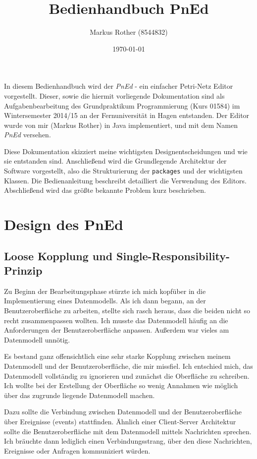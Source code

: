 \documentclass[11pt]{article}
\title{Bedienhandbuch PnEd}
\author{Markus Rother (8544832)}
\date{\today}
\begin{document}
\maketitle


In diesem Bedienhandbuch wird der \emph{PnEd} - ein einfacher Petri-Netz
Editor vorgestellt.  Dieser, sowie die hiermit vorliegende
Dokumentation sind als Aufgabenbearbeitung des Grundpraktikum
Programmierung (Kurs 01584) im Wintersemester 2014/15 an der
Fernuniversität in Hagen entstanden.  Der Editor wurde von mir (Markus
Rother) in Java implementiert, und mit dem Namen \emph{PnEd} versehen.

Diese Dokumentation skizziert meine wichtigsten Designentscheidungen
und wie sie entstanden sind.  Anschließend wird die Grundlegende
Architektur der Software vorgestellt, also die Strukturierung der
\verb|packages| und der wichtigsten Klassen. Die Bedienanleitung
beschreibt detailliert die Verwendung des Editors.  Abschließend wird
das größte bekannte Problem kurz beschrieben.
\pagebreak
\tableofcontents
\pagebreak

\section{Design des PnEd}
\label{sec-1}
\subsection{Loose Kopplung und Single-Responsibility-Prinzip}
\label{sec-1-1}


   Zu Beginn der Bearbeitungsphase stürzte ich mich kopfüber in die
   Implementierung eines Datenmodells. Als ich dann begann, an der
   Benutzeroberfläche zu arbeiten, stellte sich rasch heraus, dass die
   beiden nicht so recht zusammenpassen wollten. Ich musste das
   Datenmodell häufig an die Anforderungen der Benutzeroberfläche
   anpassen.  Außerdem war vieles am Datenmodell unnötig.

   Es bestand ganz offensichtlich eine sehr starke Kopplung zwischen
   meinem Datenmodell und der Benutzeroberfläche, die mir missfiel.
   Ich entschied mich, das Datenmodell vollständig zu ignorieren und
   zunächst die Oberfläche zu schreiben.  Ich wollte bei der Erstellung der
   Oberfläche so wenig Annahmen wie möglich über das zugrunde liegende
   Datenmodell machen.

   Dazu sollte die Verbindung zwischen Datenmodell und der
   Benutzeroberfläche über Ereignisse (events) stattfinden.  Ähnlich
   einer Client-Server Architektur sollte die Benutzeroberfläche mit
   dem Datenmodell mittels Nachrichten sprechen.  Ich bräuchte dann
   lediglich einen Verbindungsstrang, über den diese Nachrichten,
   Ereignisse oder Anfragen kommuniziert würden.
\end{document}
